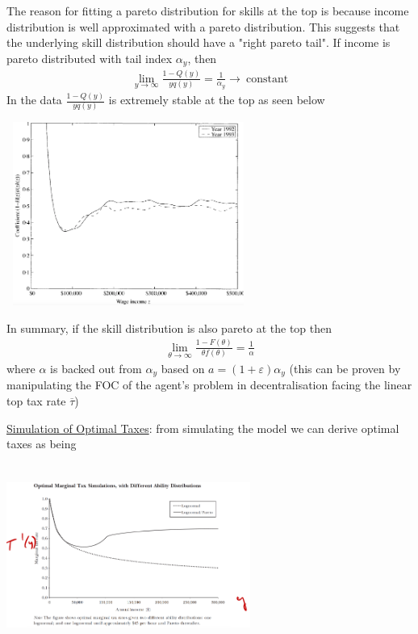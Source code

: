 \documentclass{article}
\begin{document}
\begin{itemize}
\begin{center}
    \end{center}
    The reason for fitting a pareto distribution for skills at the top is because income distribution is well approximated with a pareto distribution. This suggests that the underlying skill distribution should have a "right pareto tail". If income is pareto distributed with tail index $\alpha_{y}$, then
    \begin{gather*}
        \lim_{y \rightarrow \infty} \frac{1 - Q(y)}{y q(y)} = \frac{1}{\alpha_{y}} \rightarrow \ \text{constant}
    \end{gather*}
    In the data $\frac{1 - Q(y)}{y q(y)}$ is extremely stable at the top as seen below
    \newline
    \begin{center}
    \includegraphics[width=8cm, height=6cm]{pic20}
    \end{center}
    In summary, if the skill distribution is also pareto at the top then
    \begin{gather*}
        \lim_{\theta \rightarrow \infty} \frac{1 - F(\theta)}{\theta f(\theta)} = \frac{1}{\alpha}
    \end{gather*}
    where $\alpha$ is backed out from $\alpha_{y}$ based on $a = (1 + \varepsilon) \alpha_{y}$ (this can be proven by manipulating the FOC of the agent's problem in decentralisation facing the linear top tax rate $\overline{\tau}$)
\end{itemize}
\vspace{2.5mm}
\par \underline{Simulation of Optimal Taxes}: from simulating the model we can derive optimal taxes as being
\newline
\begin{center}
\includegraphics[width=8cm, height=6cm]{pic21}
\end{center}
\end{document}
